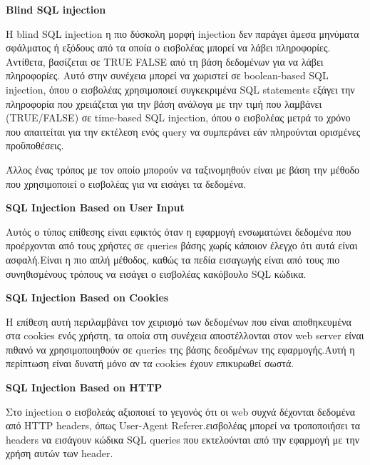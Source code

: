 \begin{center}
    \textbf{\lt Blind SQL injection}
\end{center}

Η \lt blind SQL injection  η πιο δύσκολη μορφή \lt injection  δεν παράγει άμεσα μηνύματα σφάλματος ή εξόδους από τα οποία ο εισβολέας μπορεί να λάβει πληροφορίες. Αντίθετα, βασίζεται σε \lt TRUE  \lt FALSE  από τη βάση δεδομένων για να λάβει πληροφορίες. Αυτό στην συνέχεια μπορεί  να χωριστεί σε \lt boolean-based SQL injection\gt, όπου ο εισβολέας χρησιμοποιεί συγκεκριμένα \lt SQL statements  εξάγει την πληροφορία που χρειάζεται για την βάση ανάλογα με την τιμή που λαμβάνει \lt (TRUE/FALSE)   σε \lt time-based SQL injection\gt, όπου ο εισβολέας μετρά το χρόνο που απαιτείται για την εκτέλεση ενός \lt query  να συμπεράνει εάν πληρούνται ορισμένες προϋποθέσεις.


\newpage

Άλλος ένας τρόπος με τον οποίο μπορούν να ταξινομηθούν είναι με βάση την μέθοδο που χρησιμοποιεί ο εισβολέας για να εισάγει τα δεδομένα.

\begin{center}
    \textbf{\lt SQL Injection Based on User Input}
\end{center}

Αυτός ο τύπος επίθεσης είναι εφικτός όταν η εφαρμογή ενσωματώνει δεδομένα που προέρχονται από τους χρήστες σε \lt queries  βάσης χωρίς κάποιον έλεγχο ότι αυτά είναι ασφαλή.Είναι η πιο απλή μέθοδος, καθώς τα πεδία εισαγωγής είναι από τους πιο συνηθισμένους τρόπους να εισάγει ο εισβολέας κακόβουλο \lt SQL κώδικα\gt.

\begin{center}
    \textbf{\lt SQL Injection Based on Cookies}
\end{center}


Η επίθεση αυτή περιλαμβάνει τον χειρισμό των δεδομένων που είναι αποθηκευμένα στα cookies ενός χρήστη, τα οποία στη συνέχεια αποστέλλονται στον \lt web server  είναι πιθανό να  χρησιμοποιηθούν σε \lt queries \gt της βάσης δεοδμένων της εφαρμογής.Αυτή η περίπτωση είναι δυνατή μόνο αν τα \lt cookies  έχουν επικυρωθεί σωστά.
\begin{center}
    \textbf{\lt SQL Injection Based on HTTP}
\end{center}

Στο \lt injection  ο εισβολεάς αξιοποιεί το γεγονός ότι οι \lt web  συχνά δέχονται δεδομένα από \lt HTTP headers\gt, όπως \lt User-Agent  \lt Referer. εισβολέας μπορεί να τροποποιήσει τα \lt headers  να εισάγουν κώδικα \lt SQL  \lt queries \gt που εκτελούνται από την εφαρμογή με την χρήση αυτών των \lt header.\gt

